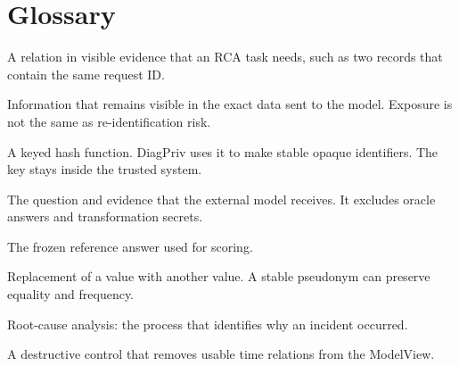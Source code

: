 \section*{Glossary}
\begin{description}
\small
\item[Diagnostic invariant.] A relation in visible evidence that an RCA task
needs, such as two records that contain the same request ID.
\item[Exposure.] Information that remains visible in the exact data sent to
the model. Exposure is not the same as re-identification risk.
\item[HMAC.] A keyed hash function. DiagPriv uses it to make stable opaque
identifiers. The key stays inside the trusted system.
\item[ModelView.] The question and evidence that the external model receives.
It excludes oracle answers and transformation secrets.
\item[Oracle.] The frozen reference answer used for scoring.
\item[Pseudonymization.] Replacement of a value with another value. A stable
pseudonym can preserve equality and frequency.
\item[RCA.] Root-cause analysis: the process that identifies why an incident
occurred.
\item[Temporal ablation.] A destructive control that removes usable time
relations from the ModelView.
\end{description}

